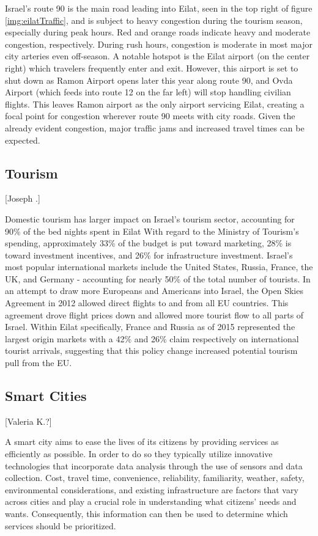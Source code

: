 \documentclass[12pt]{article}                         %
\begin{document}
Israel's route 90 is the main road leading into Eilat, seen in the top right of figure \ref{img:eilatTraffic}, and is subject to heavy congestion during the tourism season, especially during peak hours. Red and orange roads indicate heavy and moderate congestion, respectively. During rush hours, congestion is moderate in most major city arteries even off-season. A notable hotspot is the Eilat airport (on the center right) which travelers frequently enter and exit. However, this airport is set to shut down as Ramon Airport opens later this year along route 90, and Ovda Airport (which feeds into route 12 on the far left) will stop handling civilian flights. This leaves Ramon airport as the only airport servicing Eilat, creating a focal point for congestion wherever route 90 meets with city roads. Given the already evident congestion, major traffic jams and increased travel times can be expected. 

\subsection{Tourism}[Joseph .]

Domestic tourism has larger impact on Israel’s tourism sector, accounting for 90\% of the bed nights spent in Eilat \cite{} With regard to the Ministry of Tourism’s spending, approximately 33\% of the budget is put toward marketing, 28\% is toward investment incentives, and 26\% for infrastructure investment. Israel’s most popular international markets include the United States, Russia, France, the UK, and Germany - accounting for nearly 50\% of the total number of tourists. In an attempt to draw more Europeans and Americans into Israel, the Open Skies Agreement in 2012 allowed direct flights to and from all EU countries. This agreement drove flight prices down and allowed more tourist flow to all parts of Israel. Within Eilat specifically, France and Russia as of 2015 represented the largest origin markets with a 42\% and 26\% claim respectively on international tourist arrivals, suggesting that this policy change increased potential tourism pull from the EU.



\subsection{Smart Cities}[Valeria K.?]

A smart city aims to ease the lives of its citizens by providing services as efficiently as possible. In order to do so they typically utilize innovative technologies that incorporate data analysis through the use of sensors and data collection. Cost, travel time, convenience, reliability, familiarity, weather, safety, environmental considerations, and existing infrastructure are factors that vary across cities and play a crucial role in understanding what citizens' needs and wants. Consequently, this information can then be used to determine which services should be prioritized. 
\end{document}
